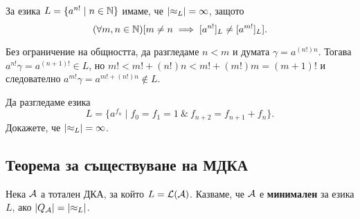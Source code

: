 \begin{example}
  За езика $L = \{a^{n!} \mid n \in \mathbb{N}\}$ имаме, че $\lvert{\approx_L}\rvert = \infty$,
  защото \[(\forall m,n\in\mathbb{N})[m \neq n \implies [a^{n!}]_L \neq [a^{m!}]_L].\]
  
  Без ограничение на общността, да разгледаме $n < m$ и думата $\gamma = a^{(n!)n}$.
  Тогава $a^{n!}\gamma = a^{(n+1)!} \in L$, но 
  $m! < m! + (n!)n < m! + (m!)m = (m+1)!$ и следователно $a^{m!}\gamma = a^{m!+(n!)n}\not\in L$.
\end{example}

\begin{problem}
  Да разгледаме езика
  \[L = \{a^{f_n} \mid f_0 = f_1 = 1\ \&\ f_{n+2} = f_{n+1} + f_{n}\}.\]
  Докажете, че $\lvert{\approx_L}\rvert = \infty$.
\end{problem}


\subsection*{Теорема за съществуване на МДКА}

\begin{dfn}
  Нека $\mathcal{A}$ а тотален ДКА, за който $L = \mathcal{L}(\mathcal{A})$.
  Казваме, че $\mathcal{A}$ е {\bf минимален} за езика $L$, ако $\lvert{Q_{\mathcal{A}}}\rvert = \lvert{\approx_L}\rvert$.
\end{dfn}

